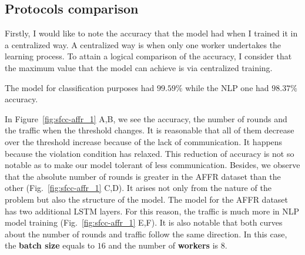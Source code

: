 \subsection{Protocols comparison}\label{subsec:protocols-comparison}

Firstly, I would like to note the accuracy that the model had when I trained it in a centralized way.
A centralized way is when only one worker undertakes the learning process.
To attain a logical comparison of the accuracy, I consider that the maximum value that the model can achieve is via centralized training.

The model for classification purposes had $99.59\%$ while the  NLP one had $98.37\%$ accuracy.

In Figure~\ref{fig:sfcc-affr_1} A,B, we see the accuracy, the number of rounds and the traffic when the threshold changes.
It is reasonable that all of them decrease over the threshold increase because of the lack of communication.
It happens because the violation condition has relaxed.
This reduction of accuracy is not so notable as to make our model tolerant of less communication.
Besides, we observe that the absolute number of rounds is greater in the AFFR dataset than the other (Fig.~\ref{fig:sfcc-affr_1} C,D).
It arises not only from the nature of the problem but also the structure of the model.
The model for the AFFR dataset has two additional LSTM layers.
For this reason, the traffic is much more in NLP model training (Fig.~\ref{fig:sfcc-affr_1} E,F).
It is also notable that both curves about the number of rounds and traffic follow the same direction.
In this case, the \textbf{batch size} equals to $16$ and the number of \textbf{workers} is $8$.

